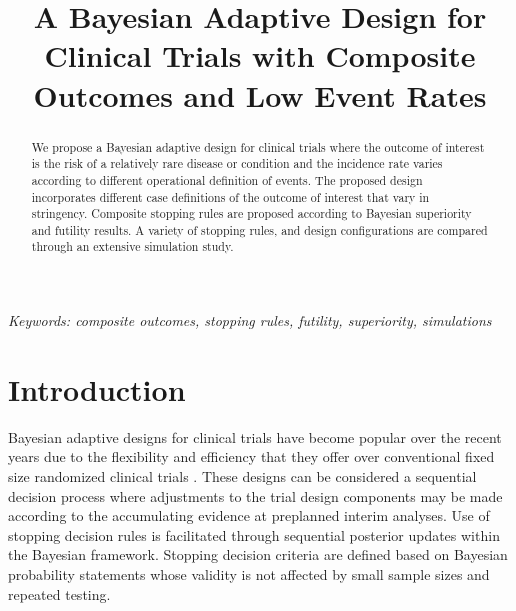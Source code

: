 \documentclass[12pt]{article}
\title{A Bayesian Adaptive Design for Clinical Trials with Composite Outcomes and Low Event Rates}
\date{}
\begin{document}
	\maketitle


\begin{abstract}
We propose a Bayesian adaptive design for clinical trials where the outcome of interest is the risk of a relatively rare disease or condition and the incidence rate varies according to different operational definition of events. The proposed design incorporates different case definitions of the outcome of interest that vary in stringency. Composite stopping rules are proposed according to Bayesian superiority and futility results. A variety of stopping rules, and design configurations are compared through an extensive simulation study.
\end{abstract}

\noindent%
{\it Keywords: composite outcomes, stopping rules, futility, superiority, simulations}  


\section{Introduction}
\label{sec:intro}

Bayesian adaptive designs for clinical trials  \citep{CheShe05, BerryBook} have become popular over the recent years due to the flexibility and efficiency that they offer over conventional fixed size randomized clinical trials \citep{HarPar16, WarWeiHan15, SatWanLog16}. These designs can be considered a sequential decision process where adjustments to the trial design components may be made according to the accumulating evidence at preplanned interim analyses. Use of stopping decision rules is facilitated through sequential posterior updates within the Bayesian framework. Stopping decision criteria are defined based on Bayesian probability statements whose validity is not affected by small sample sizes and repeated testing. 
\end{document}
